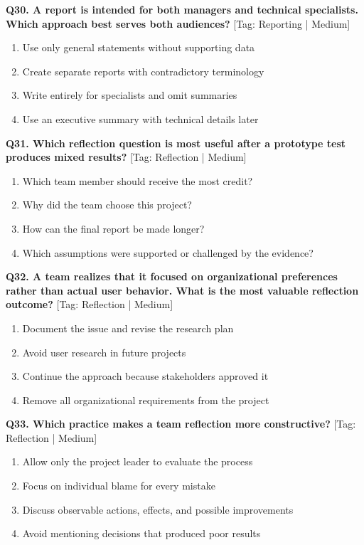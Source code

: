 \noindent\textbf{Q30. A report is intended for both managers and technical specialists. Which approach best serves both audiences?} \hfill [Tag: Reporting | Medium]
\begin{enumerate}[label=(\alph*),topsep=2pt,itemsep=1pt,partopsep=0pt,parsep=0pt]
    \item {Use only general statements without supporting data}
    \item {Create separate reports with contradictory terminology}
    \item {Write entirely for specialists and omit summaries}
    \item {Use an executive summary with technical details later}
\end{enumerate}
\vspace{2mm}

\noindent\textbf{Q31. Which reflection question is most useful after a prototype test produces mixed results?} \hfill [Tag: Reflection | Medium]
\begin{enumerate}[label=(\alph*),topsep=2pt,itemsep=1pt,partopsep=0pt,parsep=0pt]
    \item {Which team member should receive the most credit?}
    \item {Why did the team choose this project?}
    \item {How can the final report be made longer?}
    \item {Which assumptions were supported or challenged by the evidence?}
\end{enumerate}
\vspace{2mm}

\noindent\textbf{Q32. A team realizes that it focused on organizational preferences rather than actual user behavior. What is the most valuable reflection outcome?} \hfill [Tag: Reflection | Medium]
\begin{enumerate}[label=(\alph*),topsep=2pt,itemsep=1pt,partopsep=0pt,parsep=0pt]
    \item {Document the issue and revise the research plan}
    \item {Avoid user research in future projects}
    \item {Continue the approach because stakeholders approved it}
    \item {Remove all organizational requirements from the project}
\end{enumerate}
\vspace{2mm}

\noindent\textbf{Q33. Which practice makes a team reflection more constructive?} \hfill [Tag: Reflection | Medium]
\begin{enumerate}[label=(\alph*),topsep=2pt,itemsep=1pt,partopsep=0pt,parsep=0pt]
    \item {Allow only the project leader to evaluate the process}
    \item {Focus on individual blame for every mistake}
    \item {Discuss observable actions, effects, and possible improvements}
    \item {Avoid mentioning decisions that produced poor results}
\end{enumerate}
\vspace{2mm}

